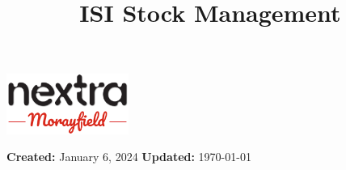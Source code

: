 \documentclass[a4paper, 12pt]{article}
\title{ISI Stock Management}
\author{}
\date{}
\begin{document}
\begin{minipage}[t]{1\columnwidth}%
    \begin{flushright}
        \vspace{-0.6in}
        \includegraphics[width=0.3\textwidth]{MonextraNew.png}
        \vspace{0.5in}
    \par\end{flushright}%
\end{minipage}
{\let\newpage\relax\maketitle}

\noindent
\textbf{Created:} January 6, 2024
\hfill
\textbf{Updated:} \today
\\\\\indent

\tableofcontents

\newpage
\end{document}
